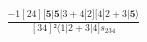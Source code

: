 \documentclass[varwidth, border=5pt]{standalone}
\begin{document}
\begin{my}
$\begin{gathered}
\scriptscriptstyle\frac{-1[24][𝟓|𝟓|3+4|2][4|2+3|𝟓⟩}{[34]²⟨1|2+3|4]s_{234}}
\end{gathered}$
\end{my}
\end{document}
